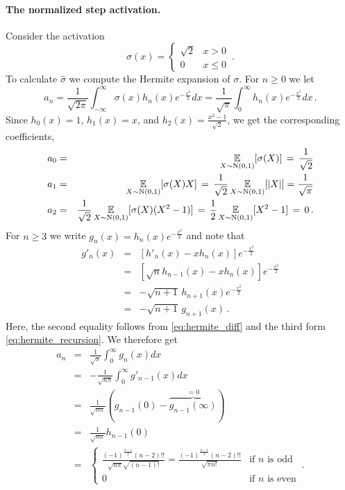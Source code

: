 \paragraph*{The normalized step activation.}
Consider the activation
$$\sigma(x)=\begin{cases} \sqrt{2} & x>0\\ 0 & x  \le 0\end{cases} \,.$$
To calculate $\hat{\sigma}$ we compute the Hermite expansion of
$\sigma$. For $n\ge 0$ we let
\[
a_n =
\frac{1}{\sqrt{2\pi}}\int_{-\infty}^\infty\sigma(x)h_n(x)e^{-\frac{x^2}{2}}dx
= 
\frac{1}{\sqrt{\pi}}\int_{0}^\infty h_n(x)e^{-\frac{x^2}{2}}dx\,.
\]
Since $h_0(x)=1$, $h_1(x)=x$, and $h_2(x)=\frac{x^2-1}{\sqrt{2}}$,
we get the corresponding coefficients,
\begin{eqnarray*}
a_0 & = &\operatorname*{\mathbb{E}}_{X\sim\text{N}(0,1)}[\sigma(X)] \,=\,\frac{1}{\sqrt{2}} \\
a_1 & = &\operatorname*{\mathbb{E}}_{X\sim\text{N}(0,1)}[\sigma(X)X] \,=\,
  \frac{1}{\sqrt{2}}\operatorname*{\mathbb{E}}_{X\sim\text{N}(0,1)}[|X|] = \frac{1}{\sqrt{\pi}} \\
a_2 & = &\frac{1}{\sqrt{2}}\operatorname*{\mathbb{E}}_{X\sim\text{N}(0,1)}[\sigma(X)(X^2-1)]
  \,=\, \frac{1}{2}\operatorname*{\mathbb{E}}_{X\sim\text{N}(0,1)}[X^2-1] \,=\, 0 \,.
\end{eqnarray*}
For $n \ge 3$ we write $g_n(x)=h_n(x)e^{-\frac{x^2}{2}}$ and note that
\begin{eqnarray*}
g'_{n}(x) &=& \left[h'_n(x)-xh_n(x)\right]e^{-\frac{x^2}{2}}
\\
&=& \left[\sqrt{n}h_{n-1}(x)-xh_n(x)\right]e^{-\frac{x^2}{2}}
\\
&=& -\sqrt{n+1}\,h_{n+1}(x)e^{-\frac{x^2}{2}}
\\
&=& -\sqrt{n+1}\,g_{n+1}(x) \,.
\end{eqnarray*}
Here, the second equality follows from \eqref{eq:hermite_diff}
and the third form \eqref{eq:hermite_recursion}.
We therefore get
\begin{eqnarray*}
a_n &=& \frac{1}{\sqrt{\pi}}\int_{0}^\infty g_n(x)dx
\\
&=& -\frac{1}{\sqrt{n\pi}}\int_{0}^\infty g'_{n-1}(x)dx
\\
&=& \frac{1}{\sqrt{n\pi}}\left(g_{n-1}(0) - \overbrace{g_{n-1}(\infty)}^{=0}
\right)
\\
&=& \frac{1}{\sqrt{n\pi}}h_{n-1}(0)
\\
&=&\begin{cases}
\frac{(-1)^{\frac{n-1}{2}}(n-2)!!}{\sqrt{n\pi}\sqrt{(n-1)!}} =
\frac{(-1)^{\frac{n-1}{2}}(n-2)!!}{\sqrt{\pi n!}}& \text{if }n\text{ is odd}
\\
0 & \text{if }n\text{ is even}
\end{cases} \,.
\end{eqnarray*}
